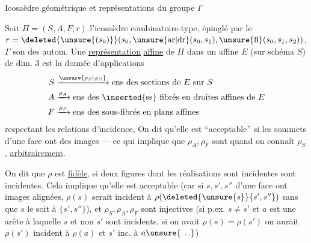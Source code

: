 Icosaèdre géométrique et représentations du groupe $\Gamma$

Soit $\Pi=(S,A,F;r)$ l'icosaèdre combinatoire-type, épinglé par le  $r=\deleted{\unsure{(s_0)}}(s_0,\unsure{\mathrm{ar}|\mathrm{dr}}(s_0,s_1),\unsure{\mathrm{fl}}(s_0,s_1,s_2))$, $\Gamma$ son  des autom. Une \uline{représentation} \uline{affine}  de $\Pi$ dans un   affine $E$ (sur schéma $S$) de dim. 3 est la donnée d'applications
\[
\begin{aligned}
 S&\xrightarrow{\unsure{\rho_S|\varphi_S}}\text{ens des sections de }E\text{ sur }S\\
 A&\xrightarrow{\rho_A}\text{ens des \inserted{ss} fibrés en droites affines de }E\\
 F&\xrightarrow{\rho_F}\text{ens des sous-fibrés en plans affines}
\end{aligned}
\]
respectant les relations d'incidence,  On dit qu'elle est   ``acceptable'' si  les sommets d'une face ont des images   --- ce qui implique que $\rho_A,\rho_F$ sont  quand on connaît $\rho_S$,   \uline{arbitrairement}.

On dit que $\rho$ est \uline{fidèle},   si  deux figures dont les réalisations  sont incidentes sont incidentes.  Cela implique qu'elle est acceptable (car si  $s,s',s''$ d'une face  ont images alignées, $\rho(s)$ serait incident à $\rho(\deleted{\unsure{s}}\{s',s''\})$ sans que $s$ le soit à $\{s',s''\}$), et $\rho_S,\rho_A,\rho_F$ sont injectives (si p.ex. $s\ne s'$ et $a$ est une arête  à laquelle $s$ et non $s'$ sont incidents, si on avait $\rho(s)=\rho(s')$ on aurait $\rho(s')$ incident à $\rho(a)$ et $s'$  inc. à $a\unsure{\ldots}$)

